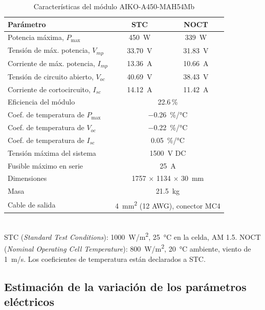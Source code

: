\begin{table}[!htb]
\caption{Características del módulo AIKO-A450-MAH54Mb \cite{aiko_ds}}
\label{tab:modulo}
\centering
\footnotesize
\setlength{\tabcolsep}{3pt}
\begin{tabular}{l c c}
\toprule
Parámetro & STC & NOCT \\
\midrule
Potencia máxima, $P_{\max}$ & \SI{450}{W} & \SI{339}{W} \\
Tensión de máx. potencia, $V_{mp}$ & \SI{33.70}{V} & \SI{31.83}{V} \\
Corriente de máx. potencia, $I_{mp}$ & \SI{13.36}{A} & \SI{10.66}{A} \\
Tensión de circuito abierto, $V_{oc}$ & \SI{40.69}{V} & \SI{38.43}{V} \\
Corriente de cortocircuito, $I_{sc}$ & \SI{14.12}{A} & \SI{11.42}{A} \\
\midrule
Eficiencia del módulo & \multicolumn{2}{c}{22.6\,\%} \\
Coef. de temperatura de $P_{\max}$ & \multicolumn{2}{c}{\SI{-0.26}{\%/\celsius}} \\
Coef. de temperatura de $V_{oc}$ & \multicolumn{2}{c}{\SI{-0.22}{\%/\celsius}} \\
Coef. de temperatura de $I_{sc}$ & \multicolumn{2}{c}{\SI[retain-explicit-plus]{+0.05}{\%/\celsius}} \\
Tensión máxima del sistema & \multicolumn{2}{c}{\SI{1500}{V} DC} \\
Fusible máximo en serie & \multicolumn{2}{c}{\SI{25}{A}} \\
Dimensiones & \multicolumn{2}{c}{\SI{1757}{} $\times$ \SI{1134}{} $\times$ \SI{30}{mm}} \\
Masa & \multicolumn{2}{c}{\SI{21.5}{kg}} \\
Cable de salida & \multicolumn{2}{c}{\SI{4}{mm^2} (12 AWG), conector MC4} \\
\bottomrule
\end{tabular}
\\[2pt]
{\footnotesize STC (\textit{Standard Test Conditions}): \SI{1000}{W/m^2}, \SI{25}{\celsius} en la celda, AM 1.5. NOCT (\textit{Nominal Operating Cell Temperature}): \SI{800}{W/m^2}, \SI{20}{\celsius} ambiente, viento de \SI{1}{m/s}. Los coeficientes de temperatura están declarados a STC.}
\end{table}

\subsection{Estimación de la variación de los parámetros eléctricos}

